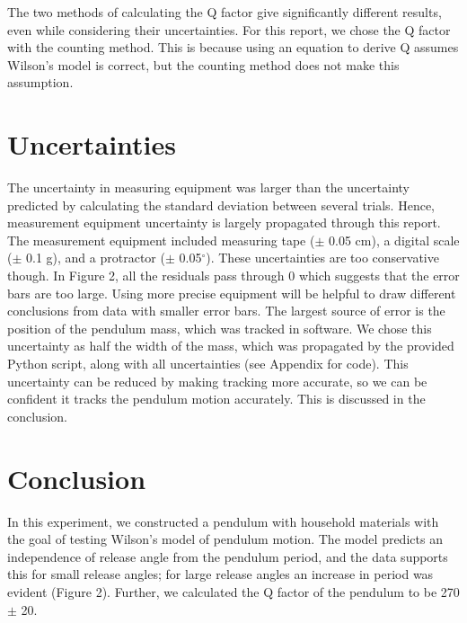 \documentclass[notitlepage,twocolumn, 12pt]{report}
\begin{document}
    The two methods of calculating the Q factor give significantly different results, even while considering their uncertainties. For this report, we chose the Q factor with the counting method. This is because using an equation to derive Q assumes Wilson's model is correct, but the counting method does not make this assumption. 
    \section{Uncertainties}
    The uncertainty in measuring equipment was larger than the uncertainty predicted by calculating the standard deviation between several trials. Hence, measurement equipment uncertainty is largely propagated through this report. The measurement equipment included measuring tape ($\pm$ 0.05 cm), a digital scale ($\pm$ 0.1 g), and a protractor ($\pm$ 0.05$^\circ$). 
    These uncertainties are too conservative though. In Figure 2, all the residuals pass through 0 which suggests that the error bars are too large. Using more precise equipment will be helpful to draw different conclusions from data with smaller error bars. 
    The largest source of error is the position of the pendulum mass, which was tracked in software. We chose this uncertainty as half the width of the mass, which was propagated by the provided Python script, along with all uncertainties (see Appendix for code). This uncertainty can be reduced by making tracking more accurate, so we can be confident it tracks the pendulum motion accurately. This is discussed in the conclusion. 
    \section{Conclusion}
    In this experiment, we constructed a pendulum with household materials with the goal of testing Wilson's model of pendulum motion. The model predicts an independence of release angle from the pendulum period, and the data supports this for small release angles; for large release angles an increase in period was evident (Figure 2). Further, we calculated the Q factor of the pendulum to be 270 $\pm$ 20.
\end{document}
